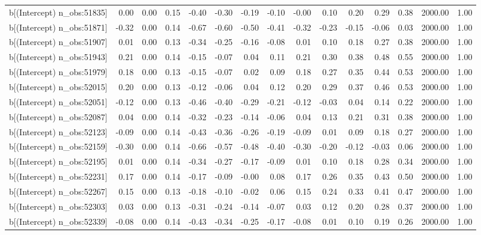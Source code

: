 \begin{table}[ht]
\begin{tabular}{rrrrrrrrrrrrrrr}
  b[(Intercept) n\_obs:51835] & 0.00 & 0.00 & 0.15 & -0.40 & -0.30 & -0.19 & -0.10 & -0.00 & 0.10 & 0.20 & 0.29 & 0.38 & 2000.00 & 1.00 \\ 
  b[(Intercept) n\_obs:51871] & -0.32 & 0.00 & 0.14 & -0.67 & -0.60 & -0.50 & -0.41 & -0.32 & -0.23 & -0.15 & -0.06 & 0.03 & 2000.00 & 1.00 \\ 
  b[(Intercept) n\_obs:51907] & 0.01 & 0.00 & 0.13 & -0.34 & -0.25 & -0.16 & -0.08 & 0.01 & 0.10 & 0.18 & 0.27 & 0.38 & 2000.00 & 1.00 \\ 
  b[(Intercept) n\_obs:51943] & 0.21 & 0.00 & 0.14 & -0.15 & -0.07 & 0.04 & 0.11 & 0.21 & 0.30 & 0.38 & 0.48 & 0.55 & 2000.00 & 1.00 \\ 
  b[(Intercept) n\_obs:51979] & 0.18 & 0.00 & 0.13 & -0.15 & -0.07 & 0.02 & 0.09 & 0.18 & 0.27 & 0.35 & 0.44 & 0.53 & 2000.00 & 1.00 \\ 
  b[(Intercept) n\_obs:52015] & 0.20 & 0.00 & 0.13 & -0.12 & -0.06 & 0.04 & 0.12 & 0.20 & 0.29 & 0.37 & 0.46 & 0.53 & 2000.00 & 1.00 \\ 
  b[(Intercept) n\_obs:52051] & -0.12 & 0.00 & 0.13 & -0.46 & -0.40 & -0.29 & -0.21 & -0.12 & -0.03 & 0.04 & 0.14 & 0.22 & 2000.00 & 1.00 \\ 
  b[(Intercept) n\_obs:52087] & 0.04 & 0.00 & 0.14 & -0.32 & -0.23 & -0.14 & -0.06 & 0.04 & 0.13 & 0.21 & 0.31 & 0.38 & 2000.00 & 1.00 \\ 
  b[(Intercept) n\_obs:52123] & -0.09 & 0.00 & 0.14 & -0.43 & -0.36 & -0.26 & -0.19 & -0.09 & 0.01 & 0.09 & 0.18 & 0.27 & 2000.00 & 1.00 \\ 
  b[(Intercept) n\_obs:52159] & -0.30 & 0.00 & 0.14 & -0.66 & -0.57 & -0.48 & -0.40 & -0.30 & -0.20 & -0.12 & -0.03 & 0.06 & 2000.00 & 1.00 \\ 
  b[(Intercept) n\_obs:52195] & 0.01 & 0.00 & 0.14 & -0.34 & -0.27 & -0.17 & -0.09 & 0.01 & 0.10 & 0.18 & 0.28 & 0.34 & 2000.00 & 1.00 \\ 
  b[(Intercept) n\_obs:52231] & 0.17 & 0.00 & 0.14 & -0.17 & -0.09 & -0.00 & 0.08 & 0.17 & 0.26 & 0.35 & 0.43 & 0.50 & 2000.00 & 1.00 \\ 
  b[(Intercept) n\_obs:52267] & 0.15 & 0.00 & 0.13 & -0.18 & -0.10 & -0.02 & 0.06 & 0.15 & 0.24 & 0.33 & 0.41 & 0.47 & 2000.00 & 1.00 \\ 
  b[(Intercept) n\_obs:52303] & 0.03 & 0.00 & 0.13 & -0.31 & -0.24 & -0.14 & -0.07 & 0.03 & 0.12 & 0.20 & 0.28 & 0.37 & 2000.00 & 1.00 \\ 
  b[(Intercept) n\_obs:52339] & -0.08 & 0.00 & 0.14 & -0.43 & -0.34 & -0.25 & -0.17 & -0.08 & 0.01 & 0.10 & 0.19 & 0.26 & 2000.00 & 1.00 \\ 

\end{tabular}
\end{table}
